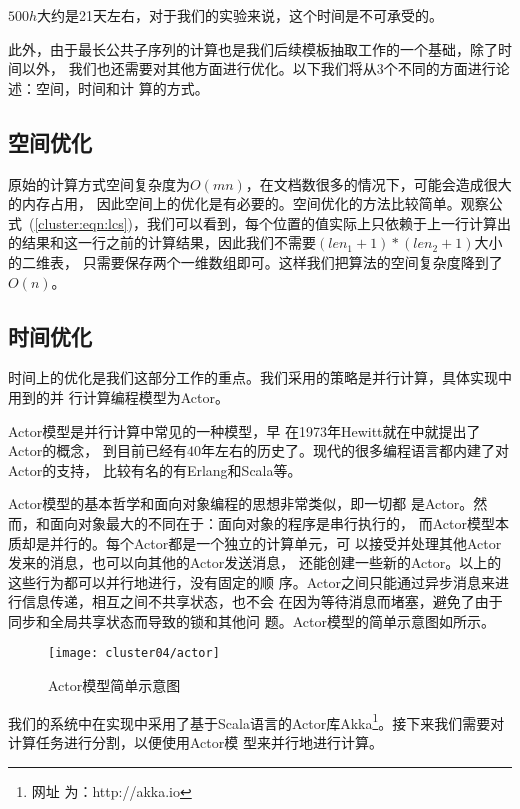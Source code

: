 $500h$大约是21天左右，对于我们的实验来说，这个时间是不可承受的。

此外，由于最长公共子序列的计算也是我们后续模板抽取工作的一个基础，除了时间以外，
我们也还需要对其他方面进行优化。以下我们将从3个不同的方面进行论述：空间，时间和计
算的方式。

\subsection{空间优化}
原始的计算方式空间复杂度为$O(mn)$，在文档数很多的情况下，可能会造成很大的内存占用，
因此空间上的优化是有必要的。空间优化的方法比较简单。观察公
式~(\ref{cluster:eqn:lcs})，我们可以看到，每个位置的值实际上只依赖于上一行计算出
的结果和这一行之前的计算结果，因此我们不需要$(len_1 + 1)* (len_2+1)$大小的二维表，
只需要保存两个一维数组即可。这样我们把算法的空间复杂度降到了$O(n)$。

\subsection{时间优化}
时间上的优化是我们这部分工作的重点。我们采用的策略是并行计算，具体实现中用到的并
行计算编程模型为Actor。

Actor模型是并行计算中常见的一种模型，早
在1973年Hewitt就在\cite{hewitt1973universal}中就提出了Actor的概念，
到目前已经有40年左右的历史了。现代的很多编程语言都内建了对Actor的支持，
比较有名的有Erlang和Scala等。

Actor模型的基本哲学和面向对象编程的思想非常类似，即一切都
是Actor。然而，和面向对象最大的不同在于：面向对象的程序是串行执行的，
而Actor模型本质却是并行的。每个Actor都是一个独立的计算单元，可
以接受并处理其他Actor发来的消息，也可以向其他的Actor发送消息，
还能创建一些新的Actor。以上的这些行为都可以并行地进行，没有固定的顺
序。Actor之间只能通过异步消息来进行信息传递，相互之间不共享状态，也不会
在因为等待消息而堵塞，避免了由于同步和全局共享状态而导致的锁和其他问
题。Actor模型的简单示意图如所示。

\begin{figure}[h]
  \centering
  \texttt{[image: cluster04/actor]}
  \caption{Actor模型简单示意图}
  \label{cluster:fig:actor}
\end{figure}

我们的系统中在实现中采用了基于Scala语言的Actor库Akka\footnote{网址
  为：http://akka.io}。接下来我们需要对计算任务进行分割，以便使用Actor模
型来并行地进行计算。

